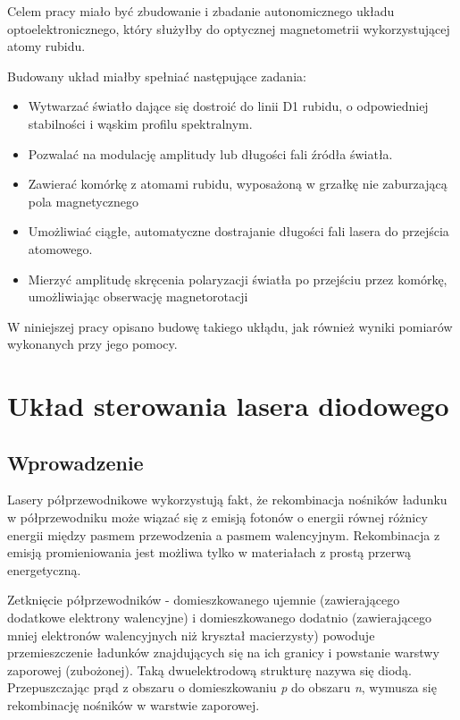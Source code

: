 \documentclass[a4paper,10pt]{article}
\begin{document}
Celem pracy miało być zbudowanie i zbadanie autonomicznego układu optoelektronicznego, który służyłby do optycznej magnetometrii wykorzystującej atomy rubidu.

Budowany układ miałby spełniać następujące zadania:
\begin{itemize}
 \item Wytwarzać światło dające się dostroić do linii D1 rubidu, o odpowiedniej stabilności i wąskim profilu spektralnym.
 \item Pozwalać na modulację amplitudy lub długości fali źródła światła.
 \item Zawierać komórkę z atomami rubidu, wyposażoną w grzałkę nie zaburzającą pola magnetycznego
 \item Umożliwiać ciągłe, automatyczne dostrajanie długości fali lasera do przejścia atomowego. 
 \item Mierzyć amplitudę skręcenia polaryzacji światła po przejściu przez komórkę, umożliwiając obserwację magnetorotacji
\end{itemize}

W niniejszej pracy opisano budowę takiego ukłądu, jak również wyniki pomiarów wykonanych przy jego pomocy.


\section{Układ sterowania lasera diodowego}



\subsection{Wprowadzenie}  %

Lasery półprzewodnikowe wykorzystują fakt, że rekombinacja nośników ładunku w półprzewodniku może wiązać się z emisją fotonów o energii równej różnicy energii między pasmem przewodzenia a pasmem walencyjnym. Rekombinacja z emisją promieniowania jest możliwa tylko w materiałach z prostą przerwą energetyczną.


Zetknięcie półprzewodników - domieszkowanego ujemnie (zawierającego dodatkowe elektrony walencyjne) i domieszkowanego dodatnio (zawierającego mniej elektronów walencyjnych niż kryształ macierzysty) powoduje przemieszczenie ładunków znajdujących się na ich granicy i powstanie warstwy zaporowej (zubożonej). Taką dwuelektrodową strukturę nazywa się diodą. Przepuszczając prąd z obszaru o domieszkowaniu \textit{p} do obszaru \textit{n}, wymusza się rekombinację nośników w warstwie zaporowej.  
\end{document}
